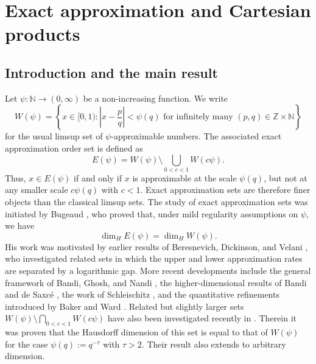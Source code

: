 \documentclass[11pt]{amsart}
\numberwithin{equation}{section}
\newcommand{\Z}{{\Bbb Z}}
\newcommand{\N}{{\Bbb N}}
\newcommand{\0}{\mathbf{0}}
\theoremstyle{remark}
\def\N{\mathbb N}
\def\Z{\mathbb Z}
\def\Z{\mathbb Z}
\def\N{\mathbb N}
\def\N{\mathbb N}
\def\Z{\mathbb Z}
\newcommand{\dimH}{\dim_{H}}
\begin{document}
\section{Exact approximation and Cartesian products}

\subsection{Introduction and the main result}
Let $\psi:\N\to(0,\infty)$ be a non-increasing function.  We write
\[
W(\psi)=\left\{x\in[0,1):\left|x-\frac pq\right|<\psi(q)
\text{ for infinitely many }(p,q)\in\Z\times\N\right\}
\]
for the usual limsup set of $\psi$-approximable numbers.  The associated exact approximation order set is defined as
\[
E(\psi)=W(\psi)\setminus\bigcup_{0<c<1}W(c\psi).
\]
Thus, $x\in E(\psi)$ if and only if $x$ is approximable at the scale $\psi(q)$, but not at any smaller scale $c\psi(q)$ with $c<1$.  Exact approximation sets are therefore finer objects than the classical limsup sets. The study of exact approximation sets was initiated by Bugeaud \cite{Bugeaud2003,Bugeaud2008, BugeaudMoreira2011}, who proved that, under mild regularity assumptions on \(\psi\), 
we have 
\begin{equation} \label{eq:gleichdim}
    \dimH E(\psi)=\dimH W(\psi).
\end{equation}
His work was motivated by earlier results of Beresnevich, Dickinson, and Velani \cite{BeresnevichDickinsonVelani}, who investigated related sets in which the upper and lower approximation rates are separated by a logarithmic gap. More recent developments include the general framework of Bandi, Ghosh, and Nandi \cite{BandiGhoshNandi}, the higher-dimensional results of Bandi and de Saxc\'e \cite{BandiDeSaxce2025}, the work of Schleischitz \cite{Joh2023RM,Joh2025MZ}, and the quantitative refinements introduced by Baker and Ward \cite{BakerWard2025}. Related but slightly larger sets  $W(\psi)\setminus\bigcap_{0<c<1}W(c\psi)$  have also been investigated recently in \cite{KLWZ}. Therein it was proven that the Hausdorff dimension of this set is equal to that of $W(\psi)$ for the case $\psi(q):=q^{-\tau}$ with $\tau>2.$ Their result also extends to arbitrary dimension.
\end{document}
